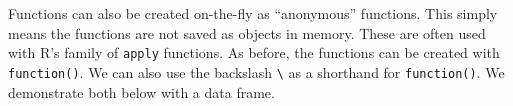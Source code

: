 \documentclass[
]{book}
\newenvironment{Shaded}{\begin{snugshade}}{\end{snugshade}}
\newcommand{\AttributeTok}[1]{\textcolor[rgb]{0.77,0.63,0.00}{#1}}
\newcommand{\ConstantTok}[1]{\textcolor[rgb]{0.00,0.00,0.00}{#1}}
\newcommand{\ControlFlowTok}[1]{\textcolor[rgb]{0.13,0.29,0.53}{\textbf{#1}}}
\newcommand{\DecValTok}[1]{\textcolor[rgb]{0.00,0.00,0.81}{#1}}
\newcommand{\ErrorTok}[1]{\textcolor[rgb]{0.64,0.00,0.00}{\textbf{#1}}}
\newcommand{\FloatTok}[1]{\textcolor[rgb]{0.00,0.00,0.81}{#1}}
\newcommand{\FunctionTok}[1]{\textcolor[rgb]{0.00,0.00,0.00}{#1}}
\newcommand{\NormalTok}[1]{#1}
\newcommand{\OtherTok}[1]{\textcolor[rgb]{0.56,0.35,0.01}{#1}}
\newcommand{\SpecialCharTok}[1]{\textcolor[rgb]{0.00,0.00,0.00}{#1}}
\newcommand{\StringTok}[1]{\textcolor[rgb]{0.31,0.60,0.02}{#1}}
\begin{document}
\begin{Shaded}
\end{Shaded}

Functions can also be created on-the-fly as ``anonymous'' functions. This simply means the functions are not saved as objects in memory. These are often used with R's family of \texttt{apply} functions. As before, the functions can be created with \texttt{function()}. We can also use the backslash \texttt{\textbackslash{}} as a shorthand for \texttt{function()}. We demonstrate both below with a data frame.
\end{document}
